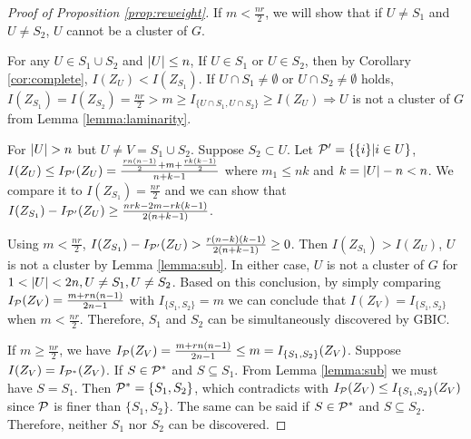 \begin{proof}[Proof of Proposition \ref{prop:reweight}]
If $m < \frac{nr}{2}$, we will show that if $U \neq S_1$ and $U \neq S_2$, $U$ cannot be a cluster of $G$.
	
For any $U \in S_1 \cup S_2 $ and $\abs{U} \leq n$, If $U \in S_1$ or $U \in S_2$, then by Corollary \ref{cor:complete}, $I(Z_U) < I(Z_{S_1})$.
If $U \cap S_1 \neq \emptyset$ or $U \cap S_2 \neq \emptyset$ holds, $I(Z_{S_1})= I(Z_{S_2}) = \frac{nr}{2} > m \geq I_{\{U \cap S_1, U \cap S_2\}} \geq I(Z_U) \Rightarrow U$ is not a cluster of $G$ from Lemma \ref{lemma:laminarity}.

For $\abs{U} > n$ but $U \neq V = S_1 \cup S_2$. Suppose $S_2 \subset U$. Let $\P' = \{\{i\}| i\in U\}$, $I(Z_U) \leq I_{\P'}(Z_U) = \frac{\frac{rn(n-1)}{2} + m + \frac{rk(k-1)}{2}}{n+k-1}$ where $m_1 \leq nk$ and $k=\abs{U} - n < n$. 
We compare it to $I(Z_{S_1}) = \frac{nr}{2}$ and we can show that $I(Z_{S_1}) - I_{\P'}(Z_U) \geq \frac{nrk-2m-rk(k-1)}{2(n+k-1)}$. 

Using $m<\frac{nr}{2}$, $I(Z_{S_1}) - I_{\P'}(Z_U) > \frac{r(n-k)(k-1)}{2(n+k-1)} \geq 0$. Then $I(Z_{S_1})>I(Z_U)$, $U$ is not a cluster by Lemma \ref{lemma:sub}. In either case, $U$ is not a cluster of $G$ for $1<\abs{U}<2n, U \neq S_1, U\neq S_2$. Based on this conclusion, by simply comparing $I_{\P}(Z_V) = \frac{m+rn(n-1)}{2n-1}$ with
$ I_{\{S_1, S_2\}}=m$ we can conclude that $I(Z_V) = I_{\{S_1, S_2\}}$ when $ m < \frac{nr}{2}$. Therefore, $S_1$ and $S_2$ can be simultaneously discovered by GBIC.

If $m \geq \frac{nr}{2}$, we have $I_{\P}(Z_V) = \frac{m+rn(n-1)}{2n-1} \leq m = I_{\{S_1, S_2\}}(Z_V)$.
Suppose $I(Z_V) = I_{\P^*}(Z_V)$.
If $S\in \P^*$ and $S\subseteq S_1$. From Lemma \ref{lemma:sub} we must have $S=S_1$. Then $\P^*=\{S_1, S_2\}$, which contradicts with
$I_{\P}(Z_V)  \leq  I_{\{S_1, S_2\}}(Z_V)$ since $\P$ is finer than $\{S_1, S_2\}$. The same can be said if $S\in \P^*$ and $S\subseteq S_2$.
Therefore, neither $S_1$ nor $S_2$ can be discovered.

\end{proof}
